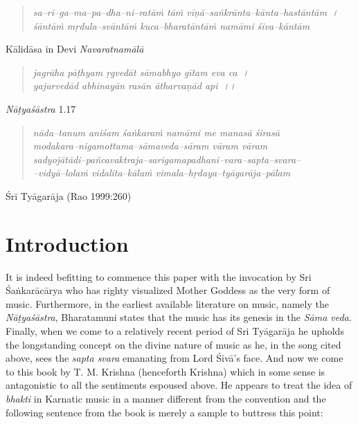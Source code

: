 \begin{verse}
\textit{sa–ri–ga–ma–pa–dha–ni–ratāṁ tāṁ vīṇā–saṅkrānta–kānta–hastāntām~।}\\\textit{śāntāṁ mṛdula–svāntāṁ kuca–bharatāntāṁ namāmi śiva–kāntām}
\end{verse}

\begin{flushright}
Kālidāsa in Devi \textit{Navaratnamālā}
\end{flushright}

\begin{verse}
\textit{jagrāha pāṭhyam ṛgvedāt sāmabhyo gītam eva ca~।}\\\textit{yajurvedād abhinayān rasān ātharvaṇād api~।।}
\end{verse}

\begin{flushright}
\textit{Nāṭyaśāstra} 1.17
\end{flushright}

\begin{verse}
\textit{nāda–tanum aniśam śaṅkaraṁ namāmi me manasā śirasā}\\\textit{modakara–nigamottama–sāmaveda–sāram vāram vāram}\\\textit{sadyojātādi–pañcavaktraja–sarigamapadhani–vara–sapta–svara–}\\\textit{–vidyā–lolaṁ vidalita–kālaṁ vimala–hṛdaya–tyāgarāja–pālam}
\end{verse}

\begin{flushright}
Śrī Tyāgarāja (Rao 1999:260)
\end{flushright}


\section*{Introduction}

It is indeed befitting to commence this paper with the invocation by Sri Śaṅkarācārya who has righty visualized Mother Goddess as the very form of music. Furthermore, in the earliest available literature on music, namely the \textit{Nāṭyaśāstra}, Bharatamuni states that the music has its genesis in the \textit{Sāma veda}. Finally, when we come to a relatively recent period of Sri Tyāgarāja he upholds the longstanding concept on the divine nature of music as he, in the song cited above, sees the \textit{sapta svara} emanating from Lord Śivā’s face. And now we come to this book by T. M. Krishna (henceforth Krishna) which in some sense is antagonistic to all the sentiments espoused above. He appears to treat the idea of \textit{bhakti} in Karnatic music in a manner different from the convention and the following sentence from the book is merely a sample to buttress this point:

